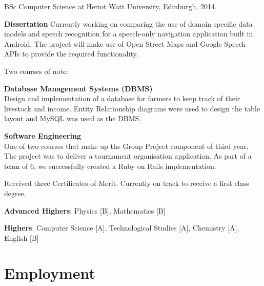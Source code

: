 \documentclass[11pt,a4paper]{article}
\renewenvironment{itemize}{
  \begin{list}{}{
    \setlength{\leftmargin}{1em}
    \setlength{\itemsep}{0.25em}
    \setlength{\parskip}{0pt}
    \setlength{\parsep}{0.25em}
    \renewcommand{\labelitemi}{$\bullet$}
  }
}{
  \end{list}
}
\begin{document}
\begin{itemize}
    \item BSc Computer Science at Heriot Watt University, Edinburgh, 2014.

    \begin{itemize}
        \item \textbf{Dissertation} Currently working on comparing the use of domain specific
          data models and speech recognition for a speech-only navigation application built in
          Android. The project will make use of Open Street Maps and Google Speech APIs to provide
          the required functionality.
        \item Two courses of note:
            \begin{itemize}
                \item \textbf{Database Management Systems (DBMS)} \\
                    Design and implementation of a database for farmers to keep track of their livestock and income.
                    Entity Relationship diagrams were used to design the table layout and MySQL was used as the DBMS.
                \item \textbf{Software Engineering} \\
                    One of two courses that make up the Group Project component of
                    third year.  
                    The project was to deliver a tournament organisation application.
                    As part of a team of 6, we successfully created a Ruby on Rails
                    implementation.
            \end{itemize}
        \item Received three Certificates of Merit. Currently on track to
            receive a first class degree.
    \end{itemize}

    \item \textbf{Advanced Highers}: Physics [B], Mathematics [B]
    \item \textbf{Highers}: Computer Science [A], Technological Studies [A], Chemistry [A], English [B]
\end{itemize}

\section*{Employment}
\end{document}
